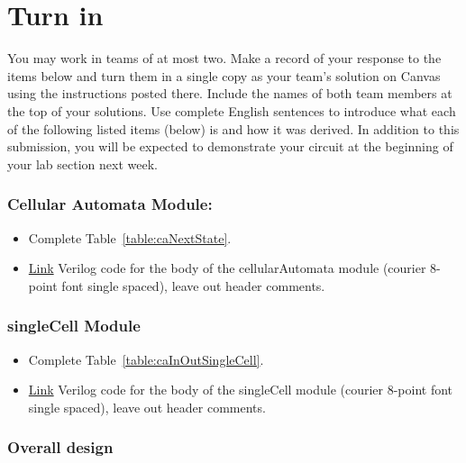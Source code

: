 \section{Turn in}

You may work in teams of at most two. Make a record of your response to
the items below and turn them in a single copy as your team's solution
on Canvas using the instructions posted there. Include the names of both
team members at the top of your solutions. Use complete English
sentences to introduce what each of the following listed items (below)
is and how it was derived. In addition to this submission, you will be
expected to demonstrate your circuit at the beginning of your lab
section next week.

\subsubsection{Cellular Automata Module: }

\begin{itemize}
\item
  Complete Table~\ref{table:caNextState}.
\item
  \protect\hyperlink{cellularAutomata_verilog}{Link} Verilog code for
  the body of the cellularAutomata module (courier 8-point font single
  spaced), leave out header comments.
\end{itemize}

\subsubsection{singleCell Module}

\begin{itemize}
\item
  Complete Table~\ref{table:caInOutSingleCell}.
\item
  \protect\hyperlink{singleCell_verilog}{Link} Verilog code for the body
  of the singleCell module (courier 8-point font single spaced), leave
  out header comments.
\end{itemize}

\subsubsection{Overall design}

